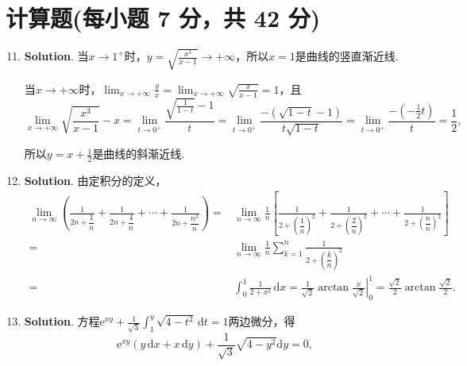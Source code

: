 \documentclass[../Main.tex]{subfiles}
\begin{document}
\section{计算题(每小题 7 分，共 42 分)}
\begin{enumerate}
    \setcounter{enumi}{10}
    \item \textbf{Solution}. 当$x\to 1^{+}$时，$y=\sqrt{\frac{x^{3}}{x-1}}\to
              +\infty$，所以$x=1$是曲线的竖直渐近线.

          当$x\to +\infty$时，$\lim_{x\to +\infty}\frac{y}{x}=\lim_{x\to +\infty}\sqrt{\frac{x}{x-1}}
              =1$，且
          \[
              \lim_{x\to +\infty}\sqrt{\frac{x^{3}}{x-1}}-x=\lim_{t\to 0^+}\frac{\sqrt{\frac{1}{1-t}}-1}{t}
              =\lim_{t\to 0^+}\frac{-\left(\sqrt{1-t}-1\right)}{t\sqrt{1-t}}=\lim_{t\to
                  0^+}\frac{-\left(-\frac{1}{2}t\right)}{t}=\frac{1}{2},
          \]

          所以$y=x+\frac{1}{2}$是曲线的斜渐近线.

    \item \textbf{Solution}. 由定积分的定义，
          \[
              \begin{aligned}
                  \lim_{n\to\infty}\left(\frac{1}{2n+\dfrac{1}{n}}+\frac{1}{2n+\dfrac{4}{n}}+\cdots+\frac{1}{2n+\dfrac{n^2}{n}}\right) = & \lim_{n\to\infty}\frac{1}{n}\left[\frac{1}{2+\left(\dfrac{1}{n}\right)^2}+\frac{1}{2+\left(\dfrac{2}{n}\right)^2}+\cdots+\frac{1}{2+\left(\dfrac{n}{n}\right)^2}\right] \\
                  =                                                                                                                      & \lim_{n\to\infty}\frac{1}{n}\sum_{k=1}^{n}\frac{1}{2+\left(\dfrac{k}{n}\right)^2}                                                                                       \\
                  =                                                                                                                      & \int_{0}^{1}\frac{1}{2+x^2}\,\mathrm{d}x = \left.\frac{1}{\sqrt{2}}\arctan\frac{x}{\sqrt{2}}\right|_{0}^{1}= \frac{\sqrt{2}}{2}\arctan\frac{\sqrt{2}}{2}.
              \end{aligned}
          \]

    \item \textbf{Solution}. 方程$\mathrm{e}^{xy}+\frac{1}{\sqrt{3}}\int_{1}
              ^{y}\sqrt{4-t^{2}}\,\mathrm{d}t=1$两边微分，得
          \[
              \mathrm{e}^{xy}(y\,\mathrm{d}x+x\,\mathrm{d}y)+\frac{1}{\sqrt{3}}\sqrt{4-y^{2}}
              \mathrm{d}y=0,
          \]


\end{enumerate}
\end{document}

